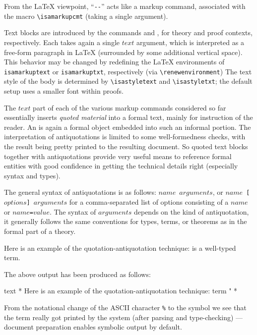 \begin{isabellebody}
\begin{isamarkuptext}
  From the {\LaTeX} viewpoint, ``\verb,--,'' acts like a markup
  command, associated with the macro \verb,\isamarkupcmt, (taking a
  single argument).

  \medskip Text blocks are introduced by the commands 
  and , for theory and proof contexts, respectively.
  Each takes again a single $text$ argument, which is interpreted as a
  free-form paragraph in {\LaTeX} (surrounded by some additional
  vertical space).  This behavior may be changed by redefining the
  {\LaTeX} environments of \verb,isamarkuptext, or
  \verb,isamarkuptxt,, respectively (via \verb,\renewenvironment,) The
  text style of the body is determined by \verb,\isastyletext, and
  \verb,\isastyletxt,; the default setup uses a smaller font within
  proofs.

  \medskip The $text$ part of each of the various markup commands
  considered so far essentially inserts \emph{quoted material} into a
  formal text, mainly for instruction of the reader.  An
   is again a formal object embedded into such
  an informal portion.  The interpretation of antiquotations is
  limited to some well-formedness checks, with the result being pretty
  printed to the resulting document.  So quoted text blocks together
  with antiquotations provide very useful means to reference formal
  entities with good confidence in getting the technical details right
  (especially syntax and types).

  The general syntax of antiquotations is as follows:
  \texttt{{\at}{\ttlbrace}$name$ $arguments${\ttrbrace}}, or
  \texttt{{\at}{\ttlbrace}$name$ [$options$] $arguments${\ttrbrace}}
  for a comma-separated list of options consisting of a $name$ or
  \texttt{$name$=$value$}.  The syntax of $arguments$ depends on the
  kind of antiquotation, it generally follows the same conventions for
  types, terms, or theorems as in the formal part of a theory.

  \medskip Here is an example of the quotation-antiquotation
  technique:  is a well-typed term.

  \medskip\noindent The above output has been produced as follows:
  \begin{ttbox}
text {\ttlbrace}*
  Here is an example of the quotation-antiquotation technique:
  {\at}{\ttlbrace}term "%
*{\ttrbrace}
  \end{ttbox}

  From the notational change of the ASCII character \verb,%, to the
  symbol \isa{{\isasymlambda}} we see that the term really got printed by the
  system (after parsing and type-checking) --- document preparation
  enables symbolic output by default.


\end{isamarkuptext}
\end{isabellebody}
